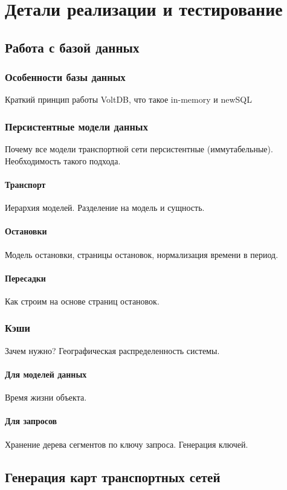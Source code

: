 \chapter{Детали реализации и тестирование}

\section{Работа с базой данных}
\subsection{Особенности базы данных}
Краткий принцип работы VoltDB, что такое in-memory и newSQL

\subsection{Персистентные модели данных}
Почему все модели транспортной сети персистентные (иммутабельные). Необходимость такого подхода.
\subsubsection{Транспорт}
Иерархия моделей. Разделение на модель и сущность.
\subsubsection{Остановки}
Модель остановки, страницы остановок, нормализация времени в период.
\subsubsection{Пересадки}
Как строим на основе страниц остановок.
\subsection{Кэши}
Зачем нужно? Географическая распределенность системы.
\subsubsection{Для моделей данных}
Время жизни объекта.
\subsubsection{Для запросов}
Хранение дерева сегментов по ключу запроса. Генерация ключей.
\section{Генерация карт транспортных сетей}
